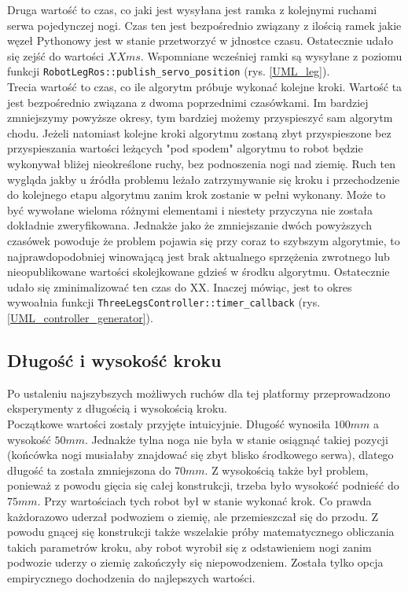 Druga wartość to czas, co jaki jest wysyłana jest ramka z kolejnymi ruchami serwa pojedynczej nogi. Czas ten jest bezpośrednio związany z ilością ramek jakie węzeł Pythonowy jest w stanie przetworzyć w jdnostce czasu. Ostatecznie udało się zejść do wartości $XX ms$. Wspomniane wcześniej ramki są wysyłane z poziomu funkcji \texttt{RobotLegRos::publish\_servo\_position} (rys. \ref{UML_leg}).\\

Trecia wartość to czas, co ile algorytm próbuje wykonać kolejne kroki. Wartość ta jest bezpośrednio związana z dwoma poprzednimi czasówkami. Im bardziej zmniejszymy powyższe okresy, tym bardziej możemy przyspieszyć sam algorytm chodu. Jeżeli natomiast kolejne kroki algorytmu zostaną zbyt przyspieszone bez przyspieszania wartości leżących "pod spodem" algorytmu to robot będzie wykonywał bliżej nieokreślone ruchy, bez podnoszenia nogi nad ziemię. Ruch ten wygląda jakby u źródła problemu leżało zatrzymywanie się kroku i przechodzenie do kolejnego etapu algorytmu zanim krok zostanie w pełni wykonany. Może to być wywołane wieloma różnymi elementami i niestety przyczyna nie została dokładnie zweryfikowana. Jednakże jako że zmniejszanie dwóch powyższych czasówek powoduje że problem pojawia się przy coraz to szybszym algorytmie, to najprawdopodobniej winowającą jest brak aktualnego sprzężenia zwrotnego lub nieopublikowane wartości skolejkowane gdzieś w środku algorytmu. Ostatecznie udało się zminimalizować ten czas do XX. Inaczej mówiąc, jest to okres wywoałnia funkcji \texttt{ThreeLegsController::timer\_callback} (rys. \ref{UML_controller_generator}).\\

\subsection{Długość i wysokość kroku}
Po ustaleniu najszybszych możliwych ruchów dla tej platformy przeprowadzono eksperymenty z długością i wysokością kroku.\\

Początkowe wartości zostaly przyjęte intuicyjnie. Długość wynosiła $100 mm$ a wysokość $50 mm$. Jednakże tylna noga nie była w stanie osiągnąć takiej pozycji (końcówka nogi musiałaby znajdować się zbyt blisko środkowego serwa), dlatego długość ta została zmniejszona do $70mm$. Z wysokością także był problem, ponieważ z powodu gięcia się całej konstrukcji, trzeba było wysokość podnieść do $75mm$. Przy wartościach tych robot był w stanie wykonać krok. Co prawda każdorazowo uderzał podwoziem o ziemię, ale przemieszczał się do przodu. Z powodu gnącej się konstrukcji także wszelakie próby matematycznego obliczania takich parametrów kroku, aby robot wyrobił się z odstawieniem nogi zanim podwozie uderzy o ziemię zakończyły się niepowodzeniem. Została tylko opcja empirycznego dochodzenia do najlepszych wartości.\\

